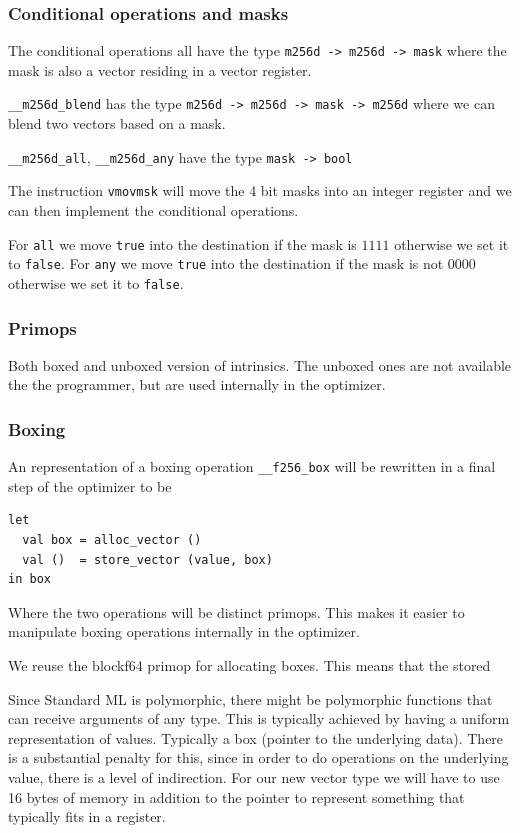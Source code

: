 \documentclass{article}
\begin{document}
\subsubsection{Conditional operations and masks}

The conditional operations all have the type \verb!m256d -> m256d -> mask! where the mask is also a vector residing in a vector register.

\verb!__m256d_blend! has the type \verb!m256d -> m256d -> mask -> m256d! where we can blend two vectors based on a mask.

\verb!__m256d_all!, \verb!__m256d_any! have the type \verb!mask -> bool!

The instruction \verb!vmovmsk! will move the 4 bit masks into an integer register and we can then implement the conditional operations.

For \verb!all! we move \verb!true! into the destination if the mask is $1111$ otherwise we set it to \verb!false!.
For \verb!any! we move \verb!true! into the destination if the mask is not $0000$ otherwise we set it to \verb!false!.

\subsubsection{Primops}

Both boxed and unboxed version of intrinsics. The unboxed ones are not available the the programmer, but are used internally in the optimizer.

\subsubsection{Boxing}

An representation of a boxing operation \verb!__f256_box! will be rewritten in a final step of the optimizer to be
\begin{lstlisting}
let
  val box = alloc_vector ()
  val ()  = store_vector (value, box)
in box
\end{lstlisting}
Where the two operations will be distinct primops. This makes it easier to manipulate boxing operations internally in the optimizer.


We reuse the blockf64 primop for allocating boxes. This means that the stored 

Since Standard ML is polymorphic, there might be polymorphic functions that can receive arguments of any type. This is typically achieved by having a uniform representation of values. Typically a box (pointer to the underlying data). There is a substantial penalty for this, since in order to do operations on the underlying value, there is a level of indirection. For our new vector type we will have to use 16 bytes of memory in addition to the pointer to represent something that typically fits in a register.
\end{document}
